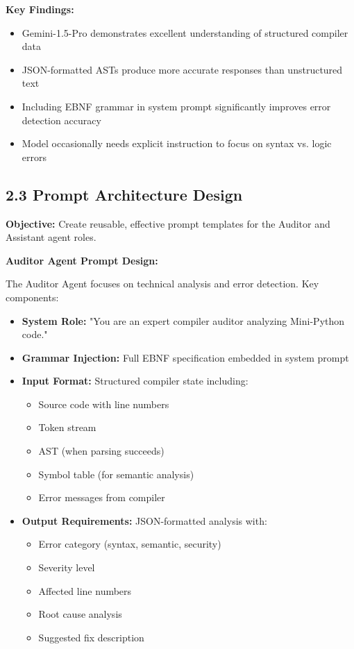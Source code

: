 \documentclass[a4paper,11pt]{article}
\begin{document}
\textbf{Key Findings:}
\begin{itemize}[leftmargin=*]
    \item Gemini-1.5-Pro demonstrates excellent understanding of structured compiler data
    \item JSON-formatted ASTs produce more accurate responses than unstructured text
    \item Including EBNF grammar in system prompt significantly improves error detection accuracy
    \item Model occasionally needs explicit instruction to focus on syntax vs. logic errors
\end{itemize}

\subsection{2.3 Prompt Architecture Design}

\textbf{Objective:} Create reusable, effective prompt templates for the Auditor and Assistant agent roles.

\textbf{Auditor Agent Prompt Design:}

The Auditor Agent focuses on technical analysis and error detection. Key components:

\begin{itemize}[leftmargin=*]
    \item \textbf{System Role:} "You are an expert compiler auditor analyzing Mini-Python code."
    \item \textbf{Grammar Injection:} Full EBNF specification embedded in system prompt
    \item \textbf{Input Format:} Structured compiler state including:
    \begin{itemize}
        \item Source code with line numbers
        \item Token stream
        \item AST (when parsing succeeds)
        \item Symbol table (for semantic analysis)
        \item Error messages from compiler
    \end{itemize}
    \item \textbf{Output Requirements:} JSON-formatted analysis with:
    \begin{itemize}
        \item Error category (syntax, semantic, security)
        \item Severity level
        \item Affected line numbers
        \item Root cause analysis
        \item Suggested fix description
    \end{itemize}
\end{itemize}
\end{document}
